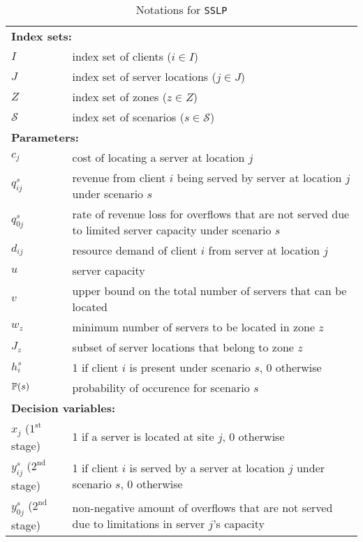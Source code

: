 \begin{table}[H]
	\caption{Notations for \texttt{SSLP}}
	\label{sslp:notation}
	\resizebox{\textwidth}{!}
	{
		\begin{tabular}{ll}
			\toprule
			\multicolumn{2}{l}{\textbf{Index sets:}} \\
			$I$ 		  & index set of clients ($i\in I$)  \\ 
			$J$ 		  & index set of server locations ($j\in J$)\\ 
			$Z$ 		  & index set of zones ($z\in Z$) \\
			$\mathcal{S}$ & index set of scenarios ($s\in \mathcal{S}$)	\\ \midrule
			\multicolumn{2}{l}{\textbf{Parameters:}} \\
			$c_j$		& cost of locating a server at location $j$	\\
			$q_{ij}^s$	& revenue from client $i$ being served by server at location $j$ under scenario $s$	\\
			$q_{0j}^s$	& rate of revenue loss for overflows that are not served due to limited server capacity under scenario $s$	\\
			$d_{ij}$	& resource demand of client $i$ from server at location $j$	\\
			$u$			& server capacity	\\
			$v$			& upper bound on the total number of servers that can be located	\\
			$w_z$		& minimum number of servers to be located in zone $z$	\\
			$J_z$		& subset of server locations that belong to zone $z$	\\
			$h_i^s$		& 1 if client $i$ is present under scenario $s$, 0 otherwise	\\
			$\operatorname*{\mathbb{P}}(s)$ 	& probability of occurence for scenario $s$\\ \midrule
			\multicolumn{2}{l}{\textbf{Decision variables:}} \\
			$x_j$ ($1^{\textrm{st}}$ stage)  	 & 1 if a server is located at site $j$, 0 otherwise \\
			$y_{ij}^s$ ($2^{\textrm{nd}}$ stage) & 1 if client $i$ is served by a server at location $j$ under scenario $s$, 0 otherwise\\
			$y_{0j}^s$ ($2^{\textrm{nd}}$ stage) & non-negative amount of overflows that are not served due to limitations in server $j$'s capacity	\\
			\bottomrule
		\end{tabular}
	}
\end{table} 

